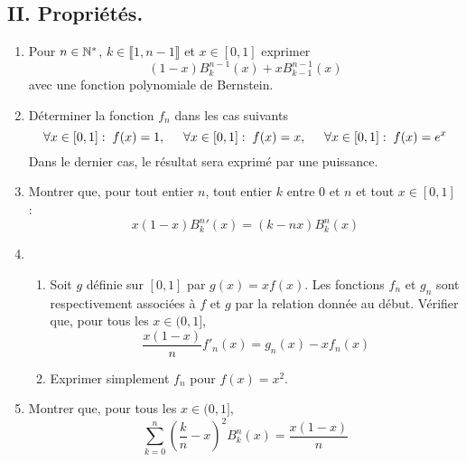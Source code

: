 \subsection*{II. Propriétés.}
\begin{enumerate}
 \item Pour $n\in \mathbb{N}^*$, $k\in \llbracket 1,n-1\rrbracket$ et $x\in [0,1]$ exprimer
\begin{displaymath}
 (1-x)B_k^{n-1}(x) + xB_{k-1}^{n-1}(x)
\end{displaymath}
avec une fonction polynomiale de Bernstein.

  \item Déterminer la fonction $f_n$ dans les cas suivants
\begin{displaymath}
 \forall x\in [0,1]:\;f(x)=1, \hspace{0.5cm}
 \forall x\in [0,1]:\; f(x)=x, \hspace{0.5cm}
 \forall x\in [0,1]:\; f(x)=e^x
\end{displaymath}
Dans le dernier cas, le résultat sera exprimé par une puissance.

  \item Montrer que, pour tout entier $n$, tout entier $k$ entre $0$ et $n$ et tout $x\in[0,1]$ :
\begin{displaymath}
x(1-x){B^n_k}'(x) = (k-nx)B^n_k(x)
\end{displaymath}


  \item
\begin{enumerate}
   \item Soit $g$ d{\'e}finie sur $[0,1]$ par $g(x)=xf(x)$. Les fonctions $f_n$ et $g_n$ sont respectivement associ{\'e}es {\`a} $f$ et $g$ par la relation donn{\'e}e au d{\'e}but.\newline
Vérifier que, pour tous les $x\in (0,1]$,
\begin{displaymath}
 \frac{x(1-x)}{n}f'_n(x)=g_n(x)-xf_n(x)
\end{displaymath}

    \item Exprimer simplement $f_n$ pour $f(x)=x^2$.
\end{enumerate}

\item Montrer que, pour tous les $x\in (0,1]$,
\begin{displaymath}
\sum_{k=0}^n (\frac{k}{n}-x)^2 B^n_k(x) = \frac{x(1-x)}{n} 
\end{displaymath}
\end{enumerate}


